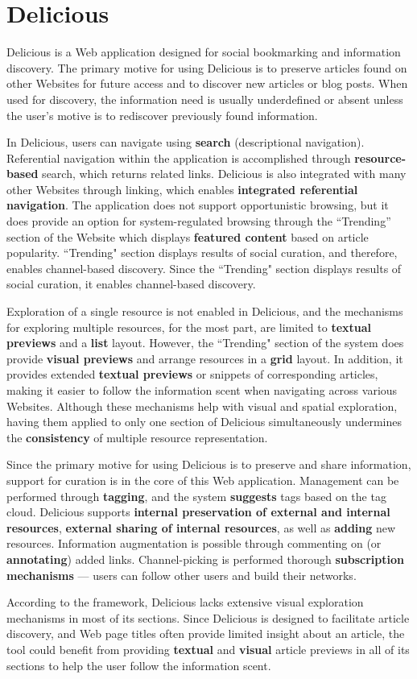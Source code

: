 {\section{Delicious}
Delicious is a Web application designed for social bookmarking and information discovery. The primary motive for using Delicious is to preserve articles found on other Websites for future access and to discover new articles or blog posts. When used for discovery, the information need is usually underdefined or absent unless the user's motive is to rediscover previously found information.   

In Delicious, users can navigate using \textbf{search} (descriptional navigation). Referential navigation within the application is accomplished through \textbf{resource-based} search, which returns related links. Delicious is also integrated with many other Websites through linking, which enables \textbf{integrated referential navigation}. The application does not support opportunistic browsing, but it does provide an option for system-regulated browsing through the ``Trending'' section of the Website which displays \textbf{featured content} based on article popularity. ``Trending" section displays results of social curation, and therefore, enables channel-based discovery. Since the ``Trending" section displays results of social curation, it enables channel-based discovery.

Exploration of a single resource is not enabled in Delicious, and the mechanisms for exploring multiple resources, for the most part, are limited to \textbf{textual previews} and a \textbf{list} layout. However, the ``Trending" section of the system does provide \textbf{visual previews} and arrange resources in a \textbf{grid} layout. In addition, it provides extended \textbf{textual previews} or snippets of corresponding articles, making it easier to follow the information scent when navigating across various Websites. Although these mechanisms help with visual and spatial exploration, having them applied to only one section of Delicious simultaneously undermines the \textbf{consistency} of multiple resource representation. 

Since the primary motive for using Delicious is to preserve and share information, support for curation is in the core of this Web application. Management can be performed through \textbf{tagging}, and the system \textbf{suggests} tags based on the tag cloud. Delicious supports \textbf{internal preservation of external and internal resources}, \textbf{external sharing of internal resources}, as well as \textbf{adding} new resources. Information augmentation is possible through commenting on (or \textbf{annotating}) added links. Channel-picking is performed thorough \textbf{subscription mechanisms} --- users can follow other users and build their networks. 

According to the framework, Delicious lacks extensive visual exploration mechanisms in most of its sections. Since Delicious is designed to facilitate article discovery, and Web page titles often provide limited insight about an article, the tool could benefit from providing \textbf{textual} and \textbf{visual} article previews in all of its sections to help the user follow the information scent. 
} %


